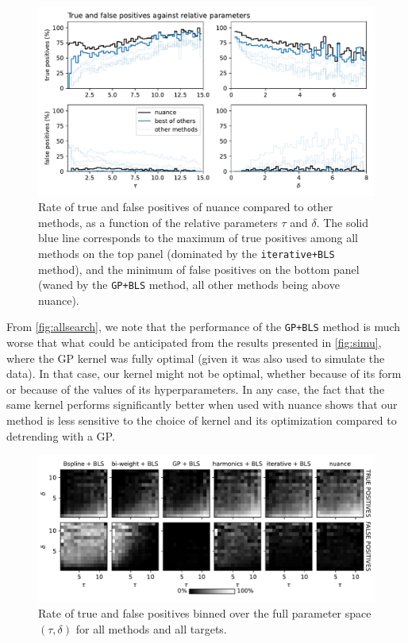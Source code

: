 \documentclass[modern]{aastex631}
\newcommand{\nuancecode}{\textsf{nuance}}
\begin{document}
\begin{figure}[H]
    \begin{centering}
        \includegraphics[width=\linewidth]{../workflows/tess_injection_recovery/figures/tpfp.pdf}
        \caption{Rate of true and false positives of \nuancecode{} compared to other methods, as a function of the relative parameters $\tau$ and $\delta$. The solid blue line corresponds to the maximum of true positives among all methods on the top panel (dominated by the \texttt{iterative+BLS} method), and the minimum of false positives on the bottom panel (waned by the \texttt{GP+BLS} method, all other methods being above \nuancecode{}).}
        \label{fig:allsearch_relative}
    \end{centering}
\end{figure}
From \autoref{fig:allsearch}, we note that the performance of the \texttt{GP+BLS} method is much worse that what could be anticipated from the results presented in \autoref{fig:simu}, where the GP kernel was fully optimal (given it was also used to simulate the data). In that case, our kernel might not be optimal, whether because of its form or because of the values of its hyperparameters. In any case, the fact that the same kernel performs significantly better when used with \nuancecode{} shows that our method is less sensitive to the choice of kernel and its optimization compared to detrending with a GP.
\begin{figure}[H]
    \begin{centering}
        \includegraphics[width=\linewidth]{../workflows/tess_injection_recovery/figures/tpfp_ims.pdf}
        \caption{Rate of true and false positives binned over the full parameter space $(\tau, \delta)$ for all methods and all targets.}
        \label{fig:allsearchim}
    \end{centering}
\end{figure}
\end{document}
